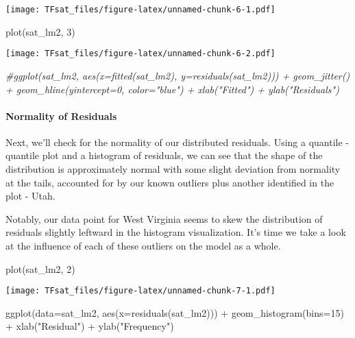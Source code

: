 \documentclass[
]{article}
\newenvironment{Shaded}{\begin{snugshade}}{\end{snugshade}}
\newcommand{\AttributeTok}[1]{\textcolor[rgb]{0.77,0.63,0.00}{#1}}
\newcommand{\CommentTok}[1]{\textcolor[rgb]{0.56,0.35,0.01}{\textit{#1}}}
\newcommand{\DecValTok}[1]{\textcolor[rgb]{0.00,0.00,0.81}{#1}}
\newcommand{\FunctionTok}[1]{\textcolor[rgb]{0.00,0.00,0.00}{#1}}
\newcommand{\NormalTok}[1]{#1}
\newcommand{\SpecialCharTok}[1]{\textcolor[rgb]{0.00,0.00,0.00}{#1}}
\newcommand{\StringTok}[1]{\textcolor[rgb]{0.31,0.60,0.02}{#1}}
\begin{document}
\texttt{[image: TFsat\_files/figure-latex/unnamed-chunk-6-1.pdf]}

\begin{Shaded}
\begin{Highlighting}[]
\FunctionTok{plot}\NormalTok{(sat\_lm2, }\DecValTok{3}\NormalTok{)}
\end{Highlighting}
\end{Shaded}

\texttt{[image: TFsat\_files/figure-latex/unnamed-chunk-6-2.pdf]}

\begin{Shaded}
\begin{Highlighting}[]
\CommentTok{\#ggplot(sat\_lm2, aes(x=fitted(sat\_lm2), y=residuals(sat\_lm2))) + geom\_jitter() + geom\_hline(yintercept=0, color="blue") + xlab("Fitted") + ylab("Residuals")}
\end{Highlighting}
\end{Shaded}

\hypertarget{normality-of-residuals}{%
\paragraph{Normality of Residuals}\label{normality-of-residuals}}

Next, we'll check for the normality of our distributed residuals. Using
a quantile - quantile plot and a histogram of residuals, we can see that
the shape of the distribution is approximately normal with some slight
deviation from normality at the tails, accounted for by our known
outliers plus another identified in the plot - Utah.

Notably, our data point for West Virginia seems to skew the distribution
of residuals slightly leftward in the histogram visualization. It's time
we take a look at the influence of each of these outliers on the model
as a whole.

\begin{Shaded}
\begin{Highlighting}[]
\FunctionTok{plot}\NormalTok{(sat\_lm2, }\DecValTok{2}\NormalTok{)}
\end{Highlighting}
\end{Shaded}

\texttt{[image: TFsat\_files/figure-latex/unnamed-chunk-7-1.pdf]}

\begin{Shaded}
\begin{Highlighting}[]
\FunctionTok{ggplot}\NormalTok{(}\AttributeTok{data=}\NormalTok{sat\_lm2, }\FunctionTok{aes}\NormalTok{(}\AttributeTok{x=}\FunctionTok{residuals}\NormalTok{(sat\_lm2))) }\SpecialCharTok{+} \FunctionTok{geom\_histogram}\NormalTok{(}\AttributeTok{bins=}\DecValTok{15}\NormalTok{) }\SpecialCharTok{+} \FunctionTok{xlab}\NormalTok{(}\StringTok{"Residual"}\NormalTok{) }\SpecialCharTok{+} \FunctionTok{ylab}\NormalTok{(}\StringTok{"Frequency"}\NormalTok{)}
\end{Highlighting}
\end{Shaded}
\end{document}

